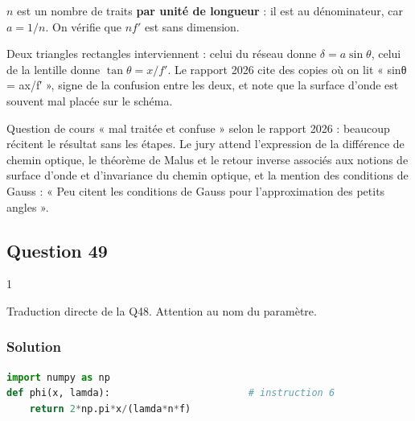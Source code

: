 \documentclass[11pt,a4paper]{article}
\begin{document}
\begin{piege}

\(n\) est un nombre de traits \textbf{par unité de longueur} : il est au dénominateur, car \(a=1/n\). On vérifie que \(nf'\) est sans dimension.

\end{piege}

\begin{piege}

Deux triangles rectangles interviennent : celui du réseau donne \(\delta=a\sin\theta\), celui de la lentille donne \(\tan\theta=x/f'\). Le rapport 2026 cite des copies où on lit « sinθ = ax/f′ », signe de la confusion entre les deux, et note que la surface d'onde est souvent mal placée sur le schéma.

\end{piege}

\begin{jury}

Question de cours « mal traitée et confuse » selon le rapport 2026 : beaucoup récitent le résultat sans les étapes. Le jury attend l'expression de la différence de chemin optique, le théorème de Malus et le retour inverse associés aux notions de surface d'onde et d'invariance du chemin optique, et la mention des conditions de Gauss : « Peu citent les conditions de Gauss pour l'approximation des petits angles ».

\end{jury}

\hypertarget{question-49}{%
\subsection{Question 49}\label{question-49}}

\begin{indication}{1}

Traduction directe de la Q48. Attention au nom du paramètre.

\end{indication}

\hypertarget{solution-48}{%
\subsubsection{Solution}\label{solution-48}}

\begin{lstlisting}[language=Python]
import numpy as np
def phi(x, lamda):                        # instruction 6
    return 2*np.pi*x/(lamda*n*f)
\end{lstlisting}
\end{document}
